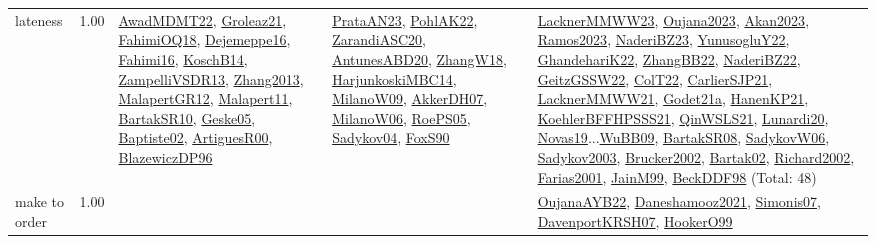 {\begin{longtable}{p{3cm}r>{\raggedright\arraybackslash}p{6cm}>{\raggedright\arraybackslash}p{6cm}>{\raggedright\arraybackslash}p{8cm}}
\index{lateness}\index{Concepts!lateness}lateness &  1.00 & \hyperref[detail:AwadMDMT22]{AwadMDMT22}, \hyperref[detail:Groleaz21]{Groleaz21}, \hyperref[detail:FahimiOQ18]{FahimiOQ18}, \hyperref[detail:Dejemeppe16]{Dejemeppe16}, \hyperref[detail:Fahimi16]{Fahimi16}, \hyperref[detail:KoschB14]{KoschB14}, \hyperref[detail:ZampelliVSDR13]{ZampelliVSDR13}, \hyperref[detail:Zhang2013]{Zhang2013}, \hyperref[detail:MalapertGR12]{MalapertGR12}, \hyperref[detail:Malapert11]{Malapert11}, \hyperref[detail:BartakSR10]{BartakSR10}, \hyperref[detail:Geske05]{Geske05}, \hyperref[detail:Baptiste02]{Baptiste02}, \hyperref[detail:ArtiguesR00]{ArtiguesR00}, \hyperref[detail:BlazewiczDP96]{BlazewiczDP96} & \hyperref[detail:PrataAN23]{PrataAN23}, \hyperref[detail:PohlAK22]{PohlAK22}, \hyperref[detail:ZarandiASC20]{ZarandiASC20}, \hyperref[detail:AntunesABD20]{AntunesABD20}, \hyperref[detail:ZhangW18]{ZhangW18}, \hyperref[detail:HarjunkoskiMBC14]{HarjunkoskiMBC14}, \hyperref[detail:MilanoW09]{MilanoW09}, \hyperref[detail:AkkerDH07]{AkkerDH07}, \hyperref[detail:MilanoW06]{MilanoW06}, \hyperref[detail:RoePS05]{RoePS05}, \hyperref[detail:Sadykov04]{Sadykov04}, \hyperref[detail:FoxS90]{FoxS90} & \hyperref[detail:LacknerMMWW23]{LacknerMMWW23}, \hyperref[detail:Oujana2023]{Oujana2023}, \hyperref[detail:Akan2023]{Akan2023}, \hyperref[detail:Ramos2023]{Ramos2023}, \hyperref[detail:NaderiBZ23]{NaderiBZ23}, \hyperref[detail:YunusogluY22]{YunusogluY22}, \hyperref[detail:GhandehariK22]{GhandehariK22}, \hyperref[detail:ZhangBB22]{ZhangBB22}, \hyperref[detail:NaderiBZ22]{NaderiBZ22}, \hyperref[detail:GeitzGSSW22]{GeitzGSSW22}, \hyperref[detail:ColT22]{ColT22}, \hyperref[detail:CarlierSJP21]{CarlierSJP21}, \hyperref[detail:LacknerMMWW21]{LacknerMMWW21}, \hyperref[detail:Godet21a]{Godet21a}, \hyperref[detail:HanenKP21]{HanenKP21}, \hyperref[detail:KoehlerBFFHPSSS21]{KoehlerBFFHPSSS21}, \hyperref[detail:QinWSLS21]{QinWSLS21}, \hyperref[detail:Lunardi20]{Lunardi20}, \hyperref[detail:Novas19]{Novas19}...\hyperref[detail:WuBB09]{WuBB09}, \hyperref[detail:BartakSR08]{BartakSR08}, \hyperref[detail:SadykovW06]{SadykovW06}, \hyperref[detail:Sadykov2003]{Sadykov2003}, \hyperref[detail:Brucker2002]{Brucker2002}, \hyperref[detail:Bartak02]{Bartak02}, \hyperref[detail:Richard2002]{Richard2002}, \hyperref[detail:Farias2001]{Farias2001}, \hyperref[detail:JainM99]{JainM99}, \hyperref[detail:BeckDDF98]{BeckDDF98} (Total: 48)\\
\index{make to order}\index{Concepts!make to order}make to order &  1.00 &  &  & \hyperref[detail:OujanaAYB22]{OujanaAYB22}, \hyperref[detail:Daneshamooz2021]{Daneshamooz2021}, \hyperref[detail:Simonis07]{Simonis07}, \hyperref[detail:DavenportKRSH07]{DavenportKRSH07}, \hyperref[detail:HookerO99]{HookerO99}\\

\end{longtable}}
